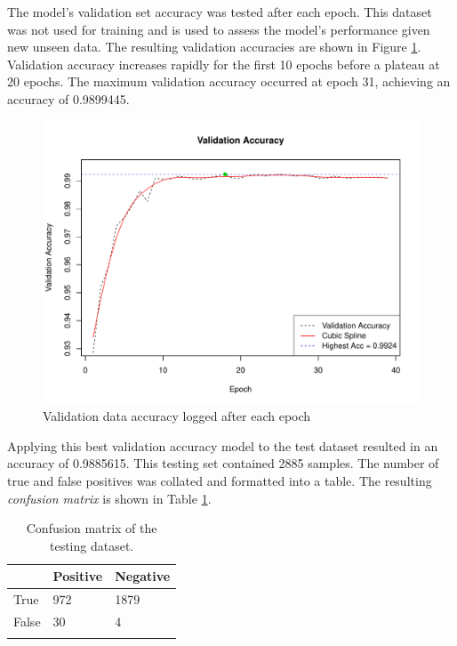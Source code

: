 The model's validation set accuracy was tested after each epoch. This dataset was not used for training and is used to assess the model's performance given new unseen data. The resulting validation accuracies are shown in Figure \ref{results-valid-acc4-fig}. Validation accuracy increases rapidly for the first 10 epochs before a plateau at 20 epochs. The maximum validation accuracy occurred at epoch 31, achieving an accuracy of 0.9899445.
\begin{figure}[ht]
	\centering
	\includegraphics[width=\textwidth]{Images/7_valid_acc4.pdf}
	\caption{Validation data accuracy logged after each epoch}
	\label{results-valid-acc4-fig}
\end{figure}

Applying this best validation accuracy model to the test dataset resulted in an accuracy of 0.9885615. This testing set contained 2885 samples. The number of true and false positives was collated and formatted into a table. The resulting \textit{confusion matrix} is shown in Table \ref{results-confmat4-tab}.

\begin{table}[ht]
	\centering
	\begin{tabular}{@{}lll@{}}
	\toprule[1.5pt]
	& Positive & Negative\\
	\midrule
	True & 972 & 1879\\
	False & 30 & 4\\
	\bottomrule[1.5pt]\\
	\end{tabular}
	\caption{Confusion matrix of the testing dataset.}
	\label{results-confmat4-tab}
\end{table}

